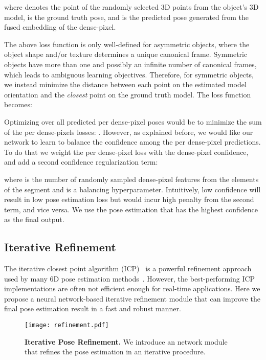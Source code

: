 \documentclass[10pt,twocolumn,letterpaper]{article}
\begin{document}
where  denotes the  point of the  randomly selected 3D points from the object's 3D model,  is the ground truth pose, and  is the predicted pose generated from the fused embedding of the  dense-pixel. 

The above loss function is only well-defined for asymmetric objects, where the object shape and/or texture determines a unique canonical frame. Symmetric objects have more than one and possibly an infinite number of canonical frames, which leads to ambiguous learning objectives. Therefore, for symmetric objects, we instead minimize the distance between each point on the estimated model orientation and the \emph{closest} point on the ground truth model. The loss function becomes:


Optimizing over all predicted per dense-pixel poses would be to minimize the sum of the per dense-pixels losses: . However, as explained before, we would like our network to learn to balance the confidence among the per dense-pixel predictions. To do that we weight the per dense-pixel loss with the dense-pixel confidence, and add a second confidence regularization term:

where  is the number of randomly sampled dense-pixel features from the  elements of the segment and  is a balancing hyperparameter. Intuitively, low confidence will result in low pose estimation loss but would incur high penalty from the second term, and vice versa. We use the pose estimation that has the highest confidence as the final output.

\subsection{Iterative Refinement}
\label{ssec::refine}

The iterative closest point algorithm (ICP)~\cite{Besl1992AMF} is a powerful refinement approach used by many 6D pose estimation methods~\cite{xiang2017posecnn,kehl2017ssd,sundermeyer2018implicit}. However, the best-performing ICP implementations are often not efficient enough for real-time applications. Here we propose a neural network-based iterative refinement module that can improve the final pose estimation result in a fast and robust manner.

\begin{figure}[t!]
	\centering
	\texttt{[image: refinement.pdf]}
	\caption{\textbf{Iterative Pose Refinement.} We introduce an network module that refines the pose estimation in an iterative procedure.}
	\label{fig:refinement}
\end{figure}
\end{document}
